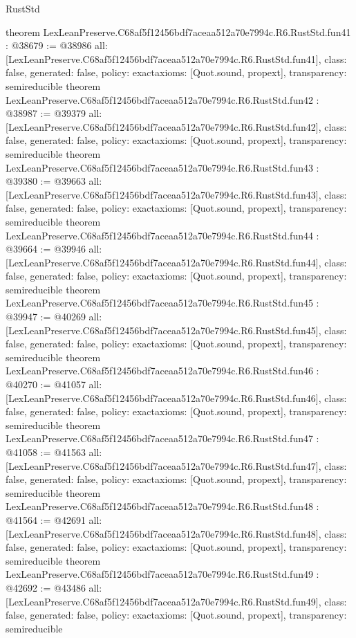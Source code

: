 \begin{lexlean}{RustStd}
\begin{coremodule}
{}
theorem LexLeanPreserve.C68af5f12456bdf7aceaa512a70e7994c.R6.RustStd.fun41 : @38679 := @38986 {
  all: [LexLeanPreserve.C68af5f12456bdf7aceaa512a70e7994c.R6.RustStd.fun41],
  class: false,
  generated: false,
  policy: exact{axioms: [Quot.sound, propext]},
  transparency: semireducible
}
theorem LexLeanPreserve.C68af5f12456bdf7aceaa512a70e7994c.R6.RustStd.fun42 : @38987 := @39379 {
  all: [LexLeanPreserve.C68af5f12456bdf7aceaa512a70e7994c.R6.RustStd.fun42],
  class: false,
  generated: false,
  policy: exact{axioms: [Quot.sound, propext]},
  transparency: semireducible
}
theorem LexLeanPreserve.C68af5f12456bdf7aceaa512a70e7994c.R6.RustStd.fun43 : @39380 := @39663 {
  all: [LexLeanPreserve.C68af5f12456bdf7aceaa512a70e7994c.R6.RustStd.fun43],
  class: false,
  generated: false,
  policy: exact{axioms: [Quot.sound, propext]},
  transparency: semireducible
}
theorem LexLeanPreserve.C68af5f12456bdf7aceaa512a70e7994c.R6.RustStd.fun44 : @39664 := @39946 {
  all: [LexLeanPreserve.C68af5f12456bdf7aceaa512a70e7994c.R6.RustStd.fun44],
  class: false,
  generated: false,
  policy: exact{axioms: [Quot.sound, propext]},
  transparency: semireducible
}
theorem LexLeanPreserve.C68af5f12456bdf7aceaa512a70e7994c.R6.RustStd.fun45 : @39947 := @40269 {
  all: [LexLeanPreserve.C68af5f12456bdf7aceaa512a70e7994c.R6.RustStd.fun45],
  class: false,
  generated: false,
  policy: exact{axioms: [Quot.sound, propext]},
  transparency: semireducible
}
theorem LexLeanPreserve.C68af5f12456bdf7aceaa512a70e7994c.R6.RustStd.fun46 : @40270 := @41057 {
  all: [LexLeanPreserve.C68af5f12456bdf7aceaa512a70e7994c.R6.RustStd.fun46],
  class: false,
  generated: false,
  policy: exact{axioms: [Quot.sound, propext]},
  transparency: semireducible
}
theorem LexLeanPreserve.C68af5f12456bdf7aceaa512a70e7994c.R6.RustStd.fun47 : @41058 := @41563 {
  all: [LexLeanPreserve.C68af5f12456bdf7aceaa512a70e7994c.R6.RustStd.fun47],
  class: false,
  generated: false,
  policy: exact{axioms: [Quot.sound, propext]},
  transparency: semireducible
}
theorem LexLeanPreserve.C68af5f12456bdf7aceaa512a70e7994c.R6.RustStd.fun48 : @41564 := @42691 {
  all: [LexLeanPreserve.C68af5f12456bdf7aceaa512a70e7994c.R6.RustStd.fun48],
  class: false,
  generated: false,
  policy: exact{axioms: [Quot.sound, propext]},
  transparency: semireducible
}
theorem LexLeanPreserve.C68af5f12456bdf7aceaa512a70e7994c.R6.RustStd.fun49 : @42692 := @43486 {
  all: [LexLeanPreserve.C68af5f12456bdf7aceaa512a70e7994c.R6.RustStd.fun49],
  class: false,
  generated: false,
  policy: exact{axioms: [Quot.sound, propext]},
  transparency: semireducible
}
\end{coremodule}
\end{lexlean}
